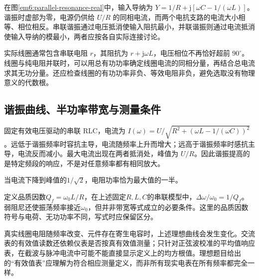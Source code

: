 在图\ref{em6:parallel-resonance-real}中，输入导纳为 $Y=1/R+\mathrm j[\omega C-1/(\omega L)]$。谐振时虚部为零，电源仍供给 $U/R$ 的同相电流，而两个电抗支路的电流大小相等、相位相反。串联谐振通过电压抵消使输入阻抗最小，并联谐振则通过电流抵消使输入导纳的模最小，两者应按各自实际连接讨论。


实际线圈通常包含串联电阻 $r$，其阻抗为 $r+\mathrm j\omega L$，电压相位不再恰好超前 $90^\circ$。线圈与纯电阻并联时，可以用总有功功率确定线圈电流的同相分量，再结合总电流求其无功分量。还应检查线圈的有功功率非负、等效电阻非负，避免选取没有物理意义的代数根。


\subsection{谐振曲线、半功率带宽与测量条件}

固定有效电压驱动的串联 RLC，电流为 $I(\omega)=U/\sqrt{R^2+(\omega L-1/(\omega C))^2}$。远低于谐振频率时容抗主导，电流随频率上升而增大；远高于谐振频率时感抗主导，电流反而减小。最大电流出现在两者抵消处，峰值为 $U/R$。因此谐振提高的是特定频段的响应，不是对任意频率都有相同放大。

当电流下降到峰值的$1/\sqrt2$，电阻功率恰为最大值的一半。

定义品质因数$Q_f=\omega_0L/R$，在上述固定$R,L,C$的串联模型中，$\Delta\omega/\omega_0=1/Q_f$。弱阻尼还使振荡频率接近$\omega_0$，但并非带宽等式成立的必要条件。这里的品质因数符号与电荷、无功功率不同，写式时应保留区分。

真实线圈电阻随频率改变、元件存在寄生电容时，上述理想曲线会发生变化。交流表的有效值读数还依赖仪表是否按真有效值测量；只针对正弦波校准的平均值响应表，在截波与脉冲电流中可能不能直接显示定义上的均方根值。理想题目给出的“有效值表”应理解为符合相应测量定义，而非所有现实电表在所有频率都完全一样。

